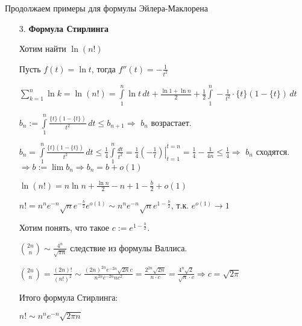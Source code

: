 Продолжаем примеры для формулы Эйлера-Маклорена
\begin{example} \thmslashn
\begin{enumerate}
    \item[3.] \textbf{Формула Стирлинга}
    
    Хотим найти $\ln (n!)$
    
    Пусть $f(t) = \ln t$, тогда $f''(t) = -\frac{1}{t^2}$
    
    $\sum\limits_{k=1}^{n} \ln k = \ln (n!) = \int\limits_{1}^{n} \ln t \,dt + \frac{\ln 1 + \ln n}{2} + \frac{1}{2} \int\limits_{1}^{n} -\frac{1}{t^2} \cdot \{t\}(1 - \{t\})\,dt$
    
    $b_n := \int\limits_{1}^{n} \frac{\{t\}(1 - \{t\})}{t^2}\,dt \leqslant b_{n+1} \Rightarrow$ $b_n$ возрастает.
    
    $b_n = \int\limits_{1}^{n} \frac{\{t\}(1 - \{t\})}{t^2}\,dt \leqslant \frac{1}{4}\int\limits_{1}^{n} \frac{dt}{t^2} = \left.\frac{1}{4} \left( -\frac{1}{t} \right) \right|_{t=1}^{t=n} = \frac{1}{4} - \frac{1}{4n} \leqslant \frac{1}{4} \Rightarrow$ $b_n$ сходятся. $\Rightarrow b:= \lim b_n \Rightarrow b_n = b + o(1)$
    
    $\ln(n!) = n\ln n + \frac{\ln n}{2} -n + 1 -\frac{b}{2} + o(1)$
    
    $n! = n^n e^{-n} \sqrt{n} e^{-\frac{b}{2}} e^{o(1)} \sim n^ne^{-n}\sqrt{n}e^{1-\frac{b}{2}}$, т.к. $e^{o(1)} \to 1$
    
    Хотим понять, что такое $c := e^{1-\frac{b}{2}}$.
    
    $\binom{2n}{n} \sim \frac{4^n}{\sqrt{\pi n}}$ следствие из формулы Валлиса.
    
    $\binom{2n}{n} = \frac{(2n)!}{(n!)^2} \sim \frac{(2n)^{2n} e^{-2n}\sqrt{2n} c}{n^{2n} e^{-2n} n c^2} = \frac{2^{2n} \sqrt{2n}}{n\cdot c} = \frac{4^n \sqrt{2}}{\sqrt{n} \cdot c} \Rightarrow c = \sqrt{2 \pi}$
    
    
    Итого формула Стирлинга:
    
    $n! \sim n^ne^{-n}\sqrt{2 \pi n}$
    
\end{enumerate}
\end{example}
